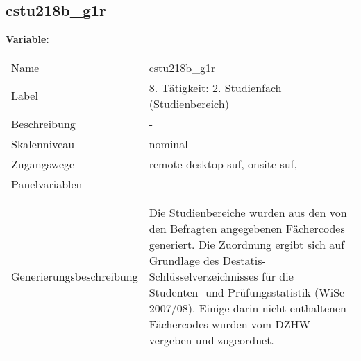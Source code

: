 	
	
	\subsection{cstu218b\_g1r}
	\label{subSection:cstu218b_g1r}

	\noindent\textbf{Variable:}\\
		\begin{tabular}{lL{11.3cm}}
			\label{tableVariable:cstu218b_g1r}
			Name & cstu218b\_g1r \\
			Label & 8. Tätigkeit: 2. Studienfach (Studienbereich) \\
			Beschreibung & - \\
			Skalenniveau & nominal \\
			Zugangswege &
				remote-desktop-suf,
				onsite-suf,
 \\
			Panelvariablen & -
			 \\
			 \\
 \\
					Generierungsbeschreibung & Die Studienbereiche wurden aus den von den Befragten angegebenen Fächercodes generiert. Die Zuordnung ergibt sich auf Grundlage des Destatis-Schlüsselverzeichnisses für die Studenten- und Prüfungsstatistik (WiSe 2007/08). Einige darin nicht enthaltenen Fächercodes wurden vom DZHW vergeben und zugeordnet. 
				 \\	
			 \\
		\end{tabular}






